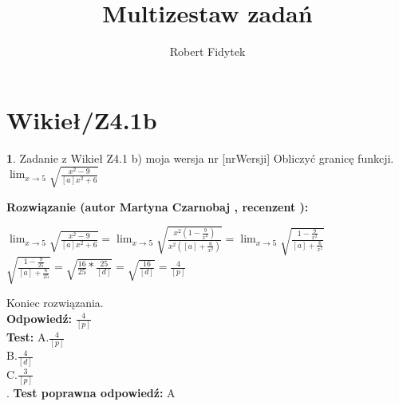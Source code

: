 \documentclass[12pt, a4paper]{article}
\title{Multizestaw zadań}
\author{Robert Fidytek}
\date{}
\theoremstyle{definition} %
\newtheorem{zad}{}
\newcommand{\kategoria}[1]{\section{#1}} %
\newcommand{\zadStart}[1]{\begin{zad}#1\newline} %
\newcommand{\zadStop}{\end{zad}}   %
\newcommand{\rozwStart}[2]{\noindent \textbf{Rozwiązanie (autor #1 , recenzent #2): }\newline} %
\newcommand{\rozwStop}{\newline}                                            %
\newcommand{\odpStart}{\noindent \textbf{Odpowiedź:}\newline}    %
\newcommand{\odpStop}{\newline}                                             %
\newcommand{\testStart}{\noindent \textbf{Test:}\newline} %
\newcommand{\testStop}{\newline} %
\newcommand{\kluczStart}{\noindent \textbf{Test poprawna odpowiedź:}\newline} %
\newcommand{\kluczStop}{\newline} %
\begin{document}
\maketitle


\kategoria{Wikieł/Z4.1b}
\zadStart{Zadanie z Wikieł Z4.1 b) moja wersja nr [nrWersji]}
Obliczyć granicę funkcji.\\
$ \displaystyle \lim_{x \to 5} \sqrt{\frac{x^{2} - 9}{[a]x^{2} + 6}}  $\\
\zadStop
\rozwStart{Martyna Czarnobaj}{}
\begin{center}
	$ \displaystyle \lim_{x \to 5} \sqrt{\frac{x^{2} - 9}{[a]x^{2} + 6}} =  
	\displaystyle \lim_{x \to 5} \sqrt{\frac{x^{2} (1 - \frac{9}{x^{2}})}{x^{2} ([a] + \frac{6}{x^{2}})}} = \displaystyle \lim_{x \to 5} \sqrt{\frac{ 1 - \frac{9}{x^{2}}}{[a] + \frac{6}{x^{2}}}} $\\
	$ \sqrt{\frac{ 1 - \frac{9}{25}}{[a] + \frac{6}{25}}} = \sqrt{\frac{16}{25} * \frac{25}{[d]}} = \sqrt{\frac{16}{[d]}} = \frac{4}{[p]} $\\
\end{center}

Koniec rozwiązania.\\
\rozwStop
\odpStart
$ \frac{4}{[p]} $\\
\odpStop
\testStart
A.$ \frac{4}{[p]} $\\
B.$ \frac{4}{[d]} $\\
C.$ \frac{3}{[p]} $\\
.
\testStop
\kluczStart
A
\kluczStop
\end{document}
